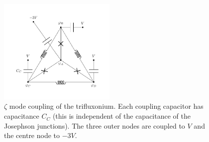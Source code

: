 \documentclass[11pt]{article}
\begin{document}
\begin{figure}
	\centering
	\includegraphics[trim={0cm 1cm 0cm 1cm}, clip, width=0.5\textwidth]{triflux_zeta_couple.pdf}
	\caption{$\zeta$ mode coupling of the trifluxonium. Each coupling capacitor has capacitance $C_C$ (this is independent of the capacitance of the Josephson junctions). The three outer nodes are coupled to $V$ and the centre node to $-3V$.}
	\label{fig_trifluxcouple}
\end{figure}
\end{document}
